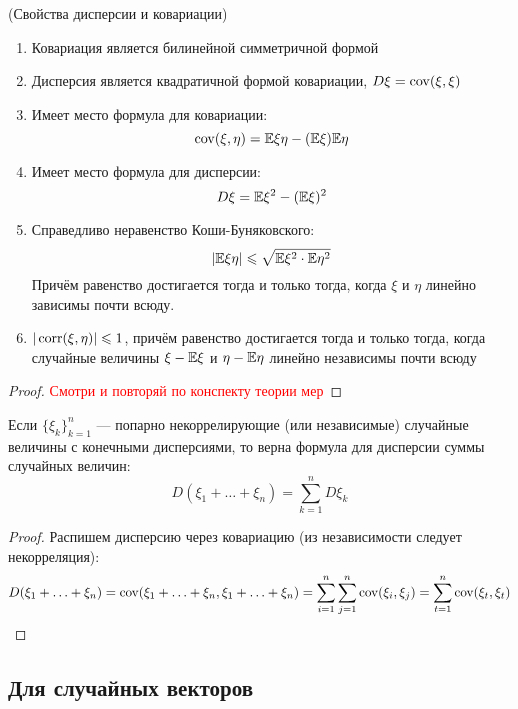 \begin{lemma} (Свойства дисперсии и ковариации)
	\begin{enumerate}
		\item Ковариация является билинейной симметричной формой
		
		\item Дисперсия является квадратичной формой ковариации, $D\xi = \operatorname{cov}(\xi, \xi)$
		
		\item Имеет место формула для ковариации:
		\[
			\operatorname{cov}(\xi, \eta) = \mathbb{E}\xi\eta - (\mathbb{E}\xi)\mathbb{E}\eta
		\]
		
		\item Имеет место формула для дисперсии:
		\[
			D\xi = \mathbb{E}\xi^2 - (\mathbb{E}\xi)^2
		\]
		
		\item Справедливо неравенство Коши-Буняковского:
		\[
			|\mathbb{E}\xi\eta| \leqslant \sqrt{\mathbb{E}\xi^2 \cdot \mathbb{E}\eta^2}
		\]
		Причём равенство достигается тогда и только тогда, когда $\xi$ и $\eta$ линейно зависимы почти всюду.
		
		\item $|\operatorname{corr}(\xi, \eta)| \leqslant 1$, причём равенство достигается тогда и только тогда, когда случайные величины $\xi - \mathbb{E}\xi$ и $\eta - \mathbb{E}\eta$ линейно независимы почти всюду
	\end{enumerate}
\end{lemma}

\begin{proof}
	\textcolor{red}{Смотри и повторяй по конспекту теории мер}
\end{proof}

\begin{corollary}
	Если $\{\xi_k\}_{k = 1}^n$ --- попарно некоррелирующие (или независимые) случайные величины с конечными дисперсиями, то верна формула для дисперсии суммы случайных величин:
	\[
		D(\xi_1 + \ldots + \xi_n) = \sum_{k = 1}^n D\xi_k
	\]
\end{corollary}

\begin{proof}
	Распишем дисперсию через ковариацию (из независимости следует некорреляция):
	\[
		D(\xi_1 + \ldots + \xi_n) = \operatorname{cov}(\xi_1 + \ldots + \xi_n, \xi_1 + \ldots + \xi_n) = \sum_{i = 1}^n \sum_{j = 1}^n \operatorname{cov}(\xi_i, \xi_j) = \sum_{t = 1}^n \operatorname{cov}(\xi_t, \xi_t)
	\]
\end{proof}

\subsection{Для случайных векторов}

